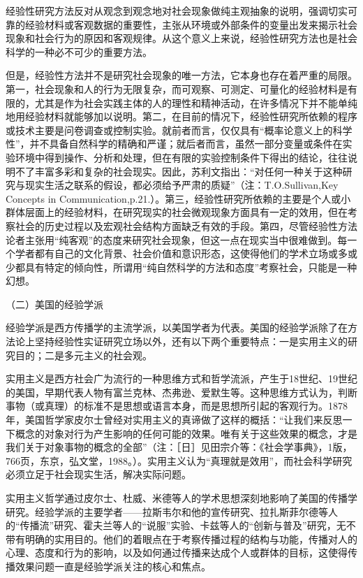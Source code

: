 \documentclass[UTF8,12pt]{ctexart}
\numberwithin{equation}{section} %
\numberwithin{figure}{section}
\numberwithin{table}{section}
\begin{document}
	经验性研究方法反对从观念到观念地对社会现象做纯主观抽象的说明，强调切实可靠的经验材料或客观数据的重要性，主张从环境或外部条件的变量出发来揭示社会现象和社会行为的原因和客观规律。从这个意义上来说，经验性研究方法也是社会科学的一种必不可少的重要方法。
	
	但是，经验性方法并不是研究社会现象的唯一方法，它本身也存在着严重的局限。第一，社会现象和人的行为无限复杂，而可观察、可测定、可量化的经验材料是有限的，尤其是作为社会实践主体的人的理性和精神活动，在许多情况下并不能单纯地用经验材料就能够加以说明。第二，在目前的情况下，经验性研究所依赖的程序或技术主要是问卷调查或控制实验。就前者而言，仅仅具有“概率论意义上的科学性”，并不具备自然科学的精确和严谨；就后者而言，虽然一部分变量或条件在实验环境中得到操作、分析和处理，但在有限的实验控制条件下得出的结论，往往说明不了丰富多彩和复杂的社会现实。因此，苏利文指出：“对任何一种关于这种研究与现实生活之联系的假设，都必须给予严肃的质疑”（注：T.O.Sullivan,Key Concepts in Communication,p.21.）。第三，经验性研究所依赖的主要是个人或小群体层面上的经验材料，在研究现实的社会微观现象方面具有一定的效用，但在考察社会的历史过程以及宏观社会结构方面缺乏有效的手段。第四，尽管经验性方法论者主张用“纯客观”的态度来研究社会现象，但这一点在现实当中很难做到。每一个学者都有自己的文化背景、社会价值和意识形态，这使得他们的学术立场或多或少都具有特定的倾向性，所谓用“纯自然科学的方法和态度”考察社会，只能是一种幻想。
	
	（二）美国的经验学派
	
	经验学派是西方传播学的主流学派，以美国学者为代表。美国的经验学派除了在方法论上坚持经验性实证研究立场以外，还有以下两个重要特点：一是实用主义的研究目的；二是多元主义的社会观。
	
	实用主义是西方社会广为流行的一种思维方式和哲学流派，产生于18世纪、19世纪的美国，早期代表人物有富兰克林、杰弗逊、爱默生等。这种思维方式认为，判断事物（或真理）的标准不是思想或语言本身，而是思想所引起的客观行为。1878年，美国哲学家皮尔士曾经对实用主义的真谛做了这样的概括：“让我们来反思一下概念的对象对行为产生影响的任何可能的效果。唯有关于这些效果的概念，才是我们关于对象事物的概念的全部”（注：［日］见田宗介等：《社会学事典》，1版，766页，东京，弘文堂，1988。）。实用主义认为“真理就是效用”，而社会科学研究必须立足于社会现实生活，解决实际问题。
	
	实用主义哲学通过皮尔士、杜威、米德等人的学术思想深刻地影响了美国的传播学研究。经验学派的主要学者——拉斯韦尔和他的宣传研究、拉扎斯菲尔德等人的“传播流”研究、霍夫兰等人的“说服”实验、卡兹等人的“创新与普及”研究，无不带有明确的实用目的。他们的着眼点在于考察传播过程的结构与功能，传播对人的心理、态度和行为的影响，以及如何通过传播来达成个人或群体的目标，这使得传播效果问题一直是经验学派关注的核心和焦点。
	
\end{document}
